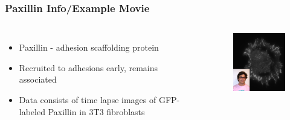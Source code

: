 \documentclass{beamer}
\begin{document}
\begin{frame}
	\frametitle{Paxillin Info/Example Movie}
	\begin{columns}
		\begin{itemize}
		\item Paxillin - adhesion scaffolding protein
		\item Recruited to adhesions early, remains associated
		\item Data consists of time lapse images of GFP-labeled Paxillin in 3T3 fibroblasts
		\end{itemize}
		\begin{center}
		\begin{figure}[htbp]
		\includegraphics[width=5cm]{figures/intro/sample_original_data_w_eric}
		\end{figure}
		\end{center}
	\end{columns}
\end{frame}
\end{document}
